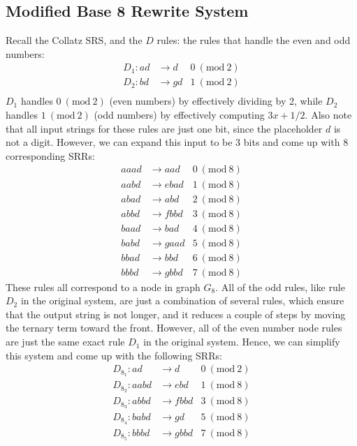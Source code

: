 \documentclass[12pt]{article}
\newcommand{\Mod}[1]{\ (\mathrm{mod}\ #1)}
\theoremstyle{definition}
\begin{document}
\subsection{Modified Base 8 Rewrite System} \label{subsec:base8rewrite}
Recall the Collatz SRS, and the $D$ rules: the rules that handle the even and odd numbers:
\begin{align*}
    D_1: ad &\rightarrow d &\text{$0\Mod{2}$}\\
    D_2: bd &\rightarrow gd &\text{$1\Mod{2}$}\\
\end{align*}
$D_1$ handles $0 \Mod{2}$ (even numbers) by effectively dividing by 2, while $D_2$ handles $1 \Mod{2}$ (odd numbers)  by effectively computing $3x+1/2$. Also note that all input strings for these rules are just one bit, since the placeholder $d$ is not a digit. However, we can expand this input to be 3 bits and come up with 8 corresponding SRRs:
\begin{align*}
    aaad &\rightarrow aad &\text{$0\Mod{8}$}\\
    aabd &\rightarrow ebad &\text{$1\Mod{8}$}\\
    abad &\rightarrow abd &\text{$2\Mod{8}$}\\
    abbd &\rightarrow fbbd &\text{$3\Mod{8}$}\\
    baad &\rightarrow bad &\text{$4\Mod{8}$}\\
    babd &\rightarrow gaad &\text{$5\Mod{8}$}\\
    bbad &\rightarrow bbd &\text{$6\Mod{8}$}\\
    bbbd &\rightarrow gbbd &\text{$7\Mod{8}$}
\end{align*}
These rules all correspond to a node in graph $G_8$. All of the odd rules, like rule $D_2$ in the original system, are just a combination of several rules, which ensure that the output string is not longer, and it reduces a couple of steps by moving the ternary term toward the front. However, all of the even number node rules are just the same exact rule $D_1$ in the original system. Hence, we can simplify this system and come up with the following SRRs:
\begin{align*}
    D_{8_1}: ad &\rightarrow d &\text{$0\Mod{2}$}\\
    D_{8_2}: aabd &\rightarrow ebd &\text{$1\Mod{8}$}\\
    D_{8_3}: abbd &\rightarrow fbbd &\text{$3\Mod{8}$}\\
    D_{8_4}: babd &\rightarrow gd &\text{$5\Mod{8}$}\\
    D_{8_5}: bbbd &\rightarrow gbbd &\text{$7\Mod{8}$}
\end{align*}
\end{document}
